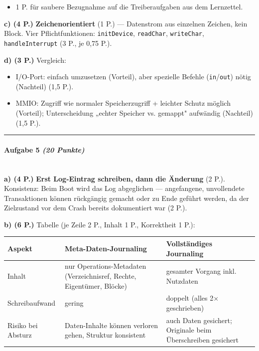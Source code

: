 \documentclass[11pt, a4paper]{article}
\begin{document}
\begin{itemize}
  \item 1 P. für saubere Bezugnahme auf die Treiberaufgaben aus dem Lernzettel.
\end{itemize}

\textbf{c) (4 P.)} \textbf{Zeichenorientiert} (1 P.) — Datenstrom aus einzelnen Zeichen, kein Block. Vier Pflichtfunktionen: \texttt{initDevice}, \texttt{readChar}, \texttt{writeChar}, \texttt{handleInterrupt} (3 P., je 0,75 P.).


\textbf{d) (3 P.)} Vergleich:

\begin{itemize}
  \item I/O-Port: einfach umzusetzen (Vorteil), aber spezielle Befehle (\texttt{in}/\texttt{out}) nötig (Nachteil) (1,5 P.).
  \item MMIO: Zugriff wie normaler Speicherzugriff + leichter Schutz möglich (Vorteil); Unterscheidung „echter Speicher vs. gemappt" aufwändig (Nachteil) (1,5 P.).
\end{itemize}


\noindent\textcolor{rulegray}{\rule{\linewidth}{0.4pt}}


\paragraph{Aufgabe 5 \textit{(20 Punkte)}}\mbox{}\\[2pt]

\textbf{a) (4 P.)} \textbf{Erst Log-Eintrag schreiben, dann die Änderung} (2 P.). Konsistenz: Beim Boot wird das Log abgeglichen — angefangene, unvollendete Transaktionen können rückgängig gemacht oder zu Ende geführt werden, da der Zielzustand vor dem Crash bereits dokumentiert war (2 P.).


\textbf{b) (6 P.)} Tabelle (je Zeile 2 P., Inhalt 1 P., Korrektheit 1 P.):


{\small
\begin{tabularx}{\linewidth}{XXX}
\hline
\rowcolor{tableheadbg}
{\color{white}\textbf{Aspekt}} & {\color{white}\textbf{Meta-Daten-Journaling}} & {\color{white}\textbf{Vollständiges Journaling}} \\[2pt]
\hline
\endhead
\hline
\endfoot
Inhalt & nur Operations-Metadaten (Verzeichnisref, Rechte, Eigentümer, Blöcke) & gesamter Vorgang inkl. Nutzdaten \\
Schreibaufwand & gering & doppelt (alles 2× geschrieben) \\
Risiko bei Absturz & Daten-Inhalte können verloren gehen, Struktur konsistent & auch Daten gesichert; Originale beim Überschreiben gesichert \\
\end{tabularx}
}
\end{document}
